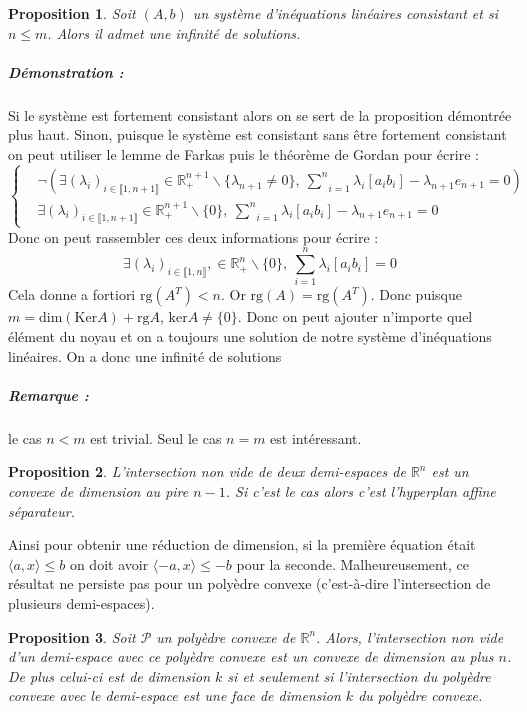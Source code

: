 \documentclass[10pt,a4paper]{article}
\newtheorem{prop}{Proposition}
\begin{document}
\begin{prop}
Soit $(A,b)$ un système d'inéquations linéaires consistant et si $n \le m$.
Alors il admet une infinité de solutions.
\end{prop}
\subparagraph{Démonstration :} Si le système est fortement consistant alors on se sert de la proposition démontrée plus haut.
Sinon, puisque le système est consistant sans être fortement consistant on peut utiliser le lemme de Farkas puis le théorème de Gordan pour écrire :
\begin{equation}
\left\lbrace
\begin{aligned}
& \neg \left( \exists (\lambda_i)_{i \in \llbracket 1,n+1 \rrbracket} \in \mathbb{R}_+^{n+1} \backslash \lbrace \lambda_{n+1} \neq 0 \rbrace, \  \underset{i=1}{\overset{n}{\sum}} \lambda_i [a_i b_i] -\lambda_{n+1} e_{n+1}=0 \right)\\
&\exists (\lambda_i)_{i \in \llbracket 1,n+1 \rrbracket} \in \mathbb{R}_+^{n+1} \backslash \lbrace 0 \rbrace, \ \underset{i=1}{\overset{n}{\sum}} \lambda_i [a_i b_i] -\lambda_{n+1} e_{n+1}=0
\end{aligned}
\right.
\end{equation}
Donc on peut rassembler ces deux informations pour écrire :
\begin{equation}
\exists (\lambda_i)_{i \in \llbracket 1,n \rrbracket}, \in \mathbb{R}_+^{n} \backslash \lbrace 0 \rbrace, \ \underset{i=1}{\overset{n}{\sum}} \lambda_i [a_i b_i]=0
\end{equation}
Cela donne a fortiori $\text{rg}(A^T) < n$.
Or $\text{rg}(A)=\text{rg}(A^T)$.
Donc puisque $m=\text{dim}(\text{Ker}A)+\text{rg}A$, $\text{ker}A \neq \lbrace 0 \rbrace$.
Donc on peut ajouter n'importe quel élément du noyau et on a toujours une solution de notre système d'inéquations linéaires.
On a donc une infinité de solutions
\subparagraph{Remarque :} le cas $n < m$ est trivial.
Seul le cas $n=m$ est intéressant.
\begin{prop}
L'intersection non vide de deux demi-espaces de $\mathbb{R}^n$ est un convexe de dimension au pire $n-1$.
Si c'est le cas alors c'est l'hyperplan affine séparateur.
\end{prop}
Ainsi pour obtenir une réduction de dimension, si la première équation était $\langle a,x \rangle \le b$ on doit avoir $\langle -a, x \rangle \le -b$ pour la seconde.
Malheureusement, ce résultat ne persiste pas   pour un polyèdre convexe (c'est-à-dire l'intersection de plusieurs demi-espaces).
\begin{prop}
Soit $\mathcal{P}$ un polyèdre convexe de $\mathbb{R}^n$.
Alors, l'intersection non vide d'un demi-espace avec ce polyèdre convexe est un convexe de dimension au plus $n$.
De plus celui-ci est de dimension $k$ si et seulement si l'intersection du polyèdre convexe avec le demi-espace est une face de dimension $k$ du polyèdre convexe.
\end{prop}
\end{document}
